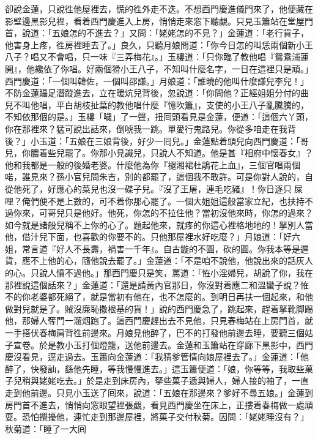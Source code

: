卻說金蓮，只說徃他屋裡去，慌的徃外走不迭。不想西門慶進儀門來了，他便藏在影壁邊黑影兒裡，看着西門慶進入上房，悄悄走來窓下聽覷。{}只見玉簫站在堂屋門首，說道：「五娘怎的不進去？」又問：「姥姥怎的不見？」金蓮道：「老行貨子，他害身上疼，徃房裡睡去了。」良久，只聽月娘問道：「你今日怎的叫恁兩個新小王八子？唱又不會唱，只一味『三弄梅花』。」玉樓道：「只你臨了教他唱『鴛鴦浦蓮開』，他纔依了你唱。好兩個猾小王八子，不知叫什麼名字，一日在這裡只是頑。」西門慶道：「一個叫韓佐，一個叫邵謙。」月娘道：「誰曉的他叫什麼謙兒李兒！」不防金蓮躡足潛蹤進去，立在暖炕兒背後，忽說道：「你問他？正經姐姐分付的曲兒不叫他唱，平白胡枝扯葉的教他唱什麼『憶吹簫』，支使的小王八子亂騰騰的，不知依那個的是。」玉樓「噦」了一聲，扭囘頭看見是金蓮，便道：「這個六丫頭，你在那裡來？猛可說出話來，倒唬我一跳。{}單愛行鬼路兒。你從多咱走在我背後？」小玉道：「五娘在三娘背後，好少一囘兒。」金蓮點着頭兒向西門慶道：「哥兒，你膿着些兒罷了。你那小見識兒，只說人不知道。他是甚『相府中懷春女』？他和我都是一般的後婚老婆。{}什麼他為你『褪湘裙杜鵑花上血』，三個官唱兩個喏，誰見來？孫小官兒問朱吉，別的都罷了，這個我不敢許。可是你對人說的，自從他死了，好應心的菜兒也沒一碟子兒。『沒了王屠，連毛吃豬』！你日逐只𠳹屎哩？俺們便不是上數的，可不着你那心罷了。一個大姐姐這般當家立紀，也扶持不過你來，{}可哥兒只是他好。他死，你怎的不拉住他？當初沒他來時，你怎的過來？如今就是諸般兒稱不上你的心了。題起他來，就疼的你這心裡格地地的！拏別人當他，借汁兒下面，{}也喜歡的你要不的。只他那屋裡水好吃麼？」月娘道：「好六姐，常言道『好人不長壽，禍害一千年』。{}自古鏇的不圓，砍的圓。你我本等是遲貨，應不上他的心，隨他說去罷了。」金蓮道：「不是咱不說他，他說出來的話灰人的心。只說人憤不過他。」那西門慶只是笑，罵道：「恠小淫婦兒，胡說了你，我在那裡說這個話來？」金蓮道：「還是請黃內官那日，{}你沒對着應二和溫蠻子說？{}恠不的你老婆都死絕了，就是當初有他在，也不怎麼的。到明日再扶一個起來，和他做對兒就是了。{}賊沒廉恥撒根基的貨！」說的西門慶急了，跳起來，趕着拏靴脚踢他，那婦人奪門一溜烟跑了。{}這西門慶趕出去不見他，只見春梅站在上房門首，就一手搭伏春梅肩背徃前邊來。{}月娘見他醉了，巴不的打發他前邊去睡，要聽三個姑子宣卷。於是教小玉打個燈籠，送他前邊去。金蓮和玉簫站在穿廊下黑影中，西門慶沒看見，逕走過去。玉簫向金蓮道：「我猜爹管情向娘屋裡去了。」金蓮道：「他醉了，快發訕，{}繇他先睡，等我慢慢進去。」{}這玉簫便道：「娘，你等等，我取些菓子兒稍與姥姥吃去。」{}於是走到床房內，拏些菓子遞與婦人，婦人接的袖了，一直走到他前邊。只見小玉送了囘來，說道：「五娘在那邊來？爹好不尋五娘。」金蓮到房門首不進去，悄悄向窓眼望裡張覷，看見西門慶坐在床上，正摟着春梅做一處頑耍。恐怕攪擾他，連忙走到那邊屋裡，將菓子交付秋菊。因問：「姥姥睡沒有？」秋菊道：「睡了一大囘